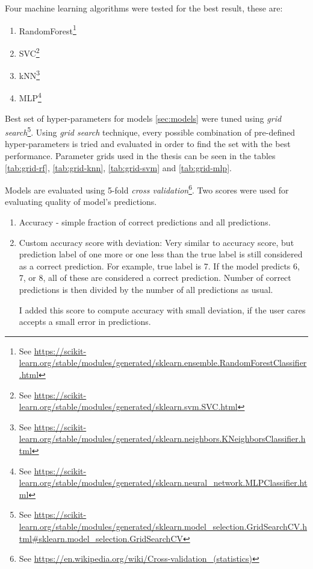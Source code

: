Four machine learning algorithms were tested for the best result, these are:

\begin{enumerate}
\label{sec:models}
    \item RandomForest\footnote{See \url{https://scikit-learn.org/stable/modules/generated/sklearn.ensemble.RandomForestClassifier.html}}
    \item SVC\footnote{See \url{https://scikit-learn.org/stable/modules/generated/sklearn.svm.SVC.html}}
    \item kNN\footnote{See \url{https://scikit-learn.org/stable/modules/generated/sklearn.neighbors.KNeighborsClassifier.html}}
    \item MLP\footnote{See \url{https://scikit-learn.org/stable/modules/generated/sklearn.neural_network.MLPClassifier.html}}
\end{enumerate}

Best set of hyper-parameters for models \ref{sec:models} were tuned using \emph{grid search}\footnote{See \url{https://scikit-learn.org/stable/modules/generated/sklearn.model_selection.GridSearchCV.html\#sklearn.model_selection.GridSearchCV}}.
Using \emph{grid search} technique, every possible combination of pre-defined hyper-parameters is tried and evaluated in order to find the set with the best performance.
Parameter grids used in the thesis can be seen in the tables \ref{tab:grid-rf}, \ref{tab:grid-knn}, \ref{tab:grid-svm} and \ref{tab:grid-mlp}.

Models are evaluated using 5-fold \emph{cross validation}\footnote{See \url{https://en.wikipedia.org/wiki/Cross-validation_(statistics)}}.
Two scores were used for evaluating quality of model's predictions.

\begin{enumerate}
    \item Accuracy - simple fraction of correct predictions and all predictions.

    \item Custom accuracy score with deviation:
    Very similar to accuracy score, but prediction label of one more or one less than the true label is still considered as a correct prediction.
    For example, true label is 7.
    If the model predicts 6, 7, or 8, all of these are considered a correct prediction.
    Number of correct predictions is then divided by the number of all predictions as usual.
    
    I added this score to compute accuracy with small deviation, if the user cares accepts a small error in predictions.
    
\end{enumerate}

